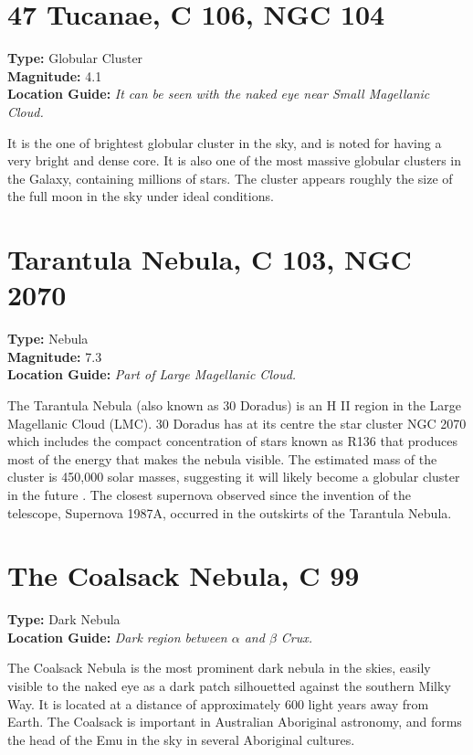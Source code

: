 \section{47 Tucanae, C 106, NGC 104}
\textbf{Type:} Globular Cluster \\
\textbf{Magnitude:} 4.1 \\ 
\textbf{Location Guide:} \textit{It can be seen with the naked eye near Small Magellanic Cloud.}

It is the one of brightest globular cluster in the sky, and is noted for having a very bright and dense core. It is also one of the most massive globular clusters in the Galaxy, containing millions of stars. The cluster appears roughly the size of the full moon in the sky under ideal conditions.

\section{Tarantula Nebula, C 103, NGC 2070}
\textbf{Type:} Nebula \\
\textbf{Magnitude:} 7.3 \\ 
\textbf{Location Guide:} \textit{Part of Large Magellanic Cloud.}

The Tarantula Nebula (also known as 30 Doradus) is an H II region in the Large Magellanic Cloud (LMC). 30 Doradus has at its centre the star cluster NGC 2070 which includes the compact concentration of stars known as R136 that produces most of the energy that makes the nebula visible. The estimated mass of the cluster is 450,000 solar masses, suggesting it will likely become a globular cluster in the future \cite{2009AJ....137.3437B}. The closest supernova observed since the invention of the telescope, Supernova 1987A, occurred in the outskirts of the Tarantula Nebula.

\section{The Coalsack Nebula, C 99}
\textbf{Type:} Dark Nebula \\
\textbf{Location Guide:} \textit{Dark region between $\alpha$ and $\beta$ Crux.}

The Coalsack Nebula is the most prominent dark nebula in the skies, easily visible to the naked eye as a dark patch silhouetted against the southern Milky Way. It is located at a distance of approximately 600 light years away from Earth. The Coalsack is important in Australian Aboriginal astronomy, and forms the head of the Emu in the sky in several Aboriginal cultures. 

